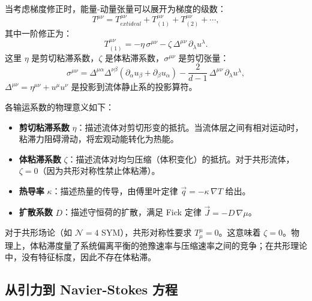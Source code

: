 \begin{definition}[粘滞流体]\label{def:viscous-fluid}
当考虑梯度修正时，能量-动量张量可以展开为梯度的级数：
\begin{equation}\label{eq:T-mu-nu-expansion}
    T^{\mu\nu} = T^{\mu\nu}_{ext{ideal}} + T^{\mu\nu}_{(1)} + T^{\mu\nu}_{(2)} + \cdots,
\end{equation}
其中一阶修正为：
\begin{equation}\label{eq:T-first-order}
    T^{\mu\nu}_{(1)} = -\eta\,\sigma^{\mu\nu} - \zeta\,\Delta^{\mu\nu}\,\partial_\lambda u^\lambda.
\end{equation}
这里 $\eta$ 是剪切粘滞系数，$\zeta$ 是体粘滞系数，$\sigma^{\mu\nu}$ 是剪切张量：
\begin{equation}\label{eq:shear-tensor}
    \sigma^{\mu\nu} = \Delta^{\mu\alpha}\Delta^{\nu\beta}\left(\partial_\alpha u_\beta + \partial_\beta u_\alpha\right) - \frac{2}{d-1}\,\Delta^{\mu\nu}\,\partial_\lambda u^\lambda,
\end{equation}
$\Delta^{\mu\nu} = \eta^{\mu\nu} + u^\mu u^\nu$ 是投影到流体静止系的投影算符。
\end{definition}

\begin{property}[输运系数的物理意义]\label{prop:transport-physical}
各输运系数的物理意义如下：
\begin{itemize}
    \item \textbf{剪切粘滞系数} $\eta$：描述流体对剪切形变的抵抗。当流体层之间有相对运动时，粘滞力阻碍滑动，将宏观动能转化为热能。
    \item \textbf{体粘滞系数} $\zeta$：描述流体对均匀压缩（体积变化）的抵抗。对于共形流体，$\zeta = 0$（因为共形对称性禁止体粘滞）。
    \item \textbf{热导率} $\kappa$：描述热量的传导，由傅里叶定律 $\vec{q} = -\kappa\,\nabla T$ 给出。
    \item \textbf{扩散系数} $D$：描述守恒荷的扩散，满足 Fick 定律 $\vec{J} = -D\,\nabla\mu$。
\end{itemize}
\end{property}

\begin{remark}[体粘滞与共形对称性]
对于共形场论（如 $\mathcal{N}=4$ SYM），共形对称性要求 $T^\mu_\mu = 0$。这意味着 $\zeta = 0$。物理上，体粘滞度量了系统偏离平衡的弛豫速率与压缩速率之间的竞争；在共形理论中，没有特征标度，因此不存在体粘滞。
\end{remark}

\subsection{从引力到 Navier-Stokes 方程}

